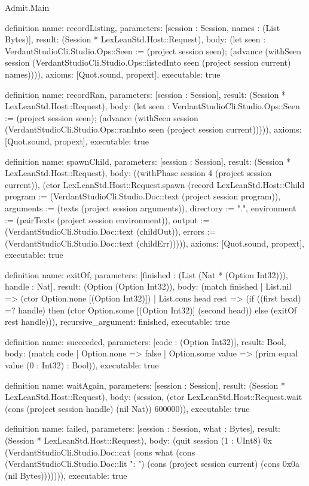 \begin{lexlean}{Admit.Main}
\begin{semanticmodule}
definition{
  name: recordListing,
  parameters: [session : Session, names : (List Bytes)],
  result: (Session * LexLeanStd.Host::Request),
  body: (let seen : VerdantStudioCli.Studio.Ops::Seen := (project session seen); (advance (withSeen session (VerdantStudioCli.Studio.Ops::listedInto seen (project session current) names)))),
  axioms: [Quot.sound, propext],
  executable: true
}

definition{
  name: recordRan,
  parameters: [session : Session],
  result: (Session * LexLeanStd.Host::Request),
  body: (let seen : VerdantStudioCli.Studio.Ops::Seen := (project session seen); (advance (withSeen session (VerdantStudioCli.Studio.Ops::ranInto seen (project session current))))),
  axioms: [Quot.sound, propext],
  executable: true
}

definition{
  name: spawnChild,
  parameters: [session : Session],
  result: (Session * LexLeanStd.Host::Request),
  body: ((withPhase session 4 (project session current)), (ctor LexLeanStd.Host::Request.spawn (record LexLeanStd.Host::Child {program := (VerdantStudioCli.Studio.Doc::text (project session program)), arguments := (texts (project session arguments)), directory := ".", environment := (pairTexts (project session environment)), output := (VerdantStudioCli.Studio.Doc::text (childOut)), errors := (VerdantStudioCli.Studio.Doc::text (childErr))}))),
  axioms: [Quot.sound, propext],
  executable: true
}

definition{
  name: exitOf,
  parameters: [finished : (List (Nat * (Option Int32))), handle : Nat],
  result: (Option (Option Int32)),
  body: (match finished
    | List.nil => (ctor Option.none [(Option Int32)])
    | List.cons head rest => (if ((first head) =? handle) then (ctor Option.some [(Option Int32)] (second head)) else (exitOf rest handle))),
  recursive_argument: finished,
  executable: true
}

definition{
  name: succeeded,
  parameters: [code : (Option Int32)],
  result: Bool,
  body: (match code
    | Option.none => false
    | Option.some value => (prim equal value (0 : Int32) : Bool)),
  executable: true
}

definition{
  name: waitAgain,
  parameters: [session : Session],
  result: (Session * LexLeanStd.Host::Request),
  body: (session, (ctor LexLeanStd.Host::Request.wait (cons (project session handle) (nil Nat)) 600000)),
  executable: true
}

definition{
  name: failed,
  parameters: [session : Session, what : Bytes],
  result: (Session * LexLeanStd.Host::Request),
  body: (quit session (1 : UInt8) 0x (VerdantStudioCli.Studio.Doc::cat (cons what (cons (VerdantStudioCli.Studio.Doc::lit ": ") (cons (project session current) (cons 0x0a (nil Bytes))))))),
  executable: true
}


\end{semanticmodule}
\end{lexlean}
